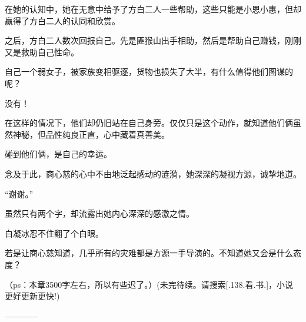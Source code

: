 \begin{this_body}
在她的认知中，她在无意中给予了方白二人一些帮助，这些只能是小恩小惠，但却赢得了方白二人的认同和欣赏。

之后，方白二人数次回报自己。先是匪猴山出手相助，然后是帮助自己赚钱，刚刚又是救助自己性命。

自己一个弱女子，被家族变相驱逐，货物也损失了大半，有什么值得他们图谋的呢？

没有！

在这样的情况下，他们却仍旧站在自己身旁。仅仅只是这个动作，就知道他们俩虽然神秘，但品性纯良正直，心中藏着真善美。

碰到他们俩，是自己的幸运。

念及于此，商心慈的心中不由地泛起感动的涟漪，她深深的凝视方源，诚挚地道。

“谢谢。”

虽然只有两个字，却流露出她内心深深的感激之情。

白凝冰忍不住翻了个白眼。

若是让商心慈知道，几乎所有的灾难都是方源一手导演的。不知道她又会是什么态度？

（ps：本章3500字左右，所以有些迟了。）(未完待续。请搜索[.138.看.书.]，小说更好更新更快!)

------------

\end{this_body}

